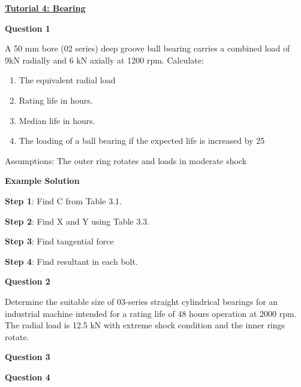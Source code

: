 \documentclass[a4paper, fleqn]{article}
\begin{document}
\underline{\textbf{Tutorial 4: Bearing}}
\vspace{10pt}

\textbf{Question 1}

A 50 mm bore (02 series) deep groove ball bearing carries a combined load of 9kN radially and 6 kN axially at 1200 rpm. Calculate:

\begin{enumerate}[label=(\roman*)]
    \item The equivalent radial load
    \item Rating life in hours.
    \item Median life in hours.
    \item The loading of a ball bearing if the expected life is increased by 25%
\end{enumerate}

Assumptions: The outer ring rotates and loads in moderate shock

\vspace{10pt}
\textbf{Example Solution}
\vspace{10pt}



\textbf{Step 1}: Find C from Table 3.1.

\textbf{Step 2}: Find X and Y using Table 3.3.

\textbf{Step 3}: Find tangential force

\textbf{Step 4}: Find resultant in each bolt.







\textbf{Question 2}

Determine the suitable size of 03-series straight cylindrical bearings for an industrial machine intended for a rating life of 48 hours operation at 2000 rpm. The radial load is 12.5 kN with extreme shock condition and the inner rings rotate.

\textbf{Question 3}




\textbf{Question 4}
\end{document}
